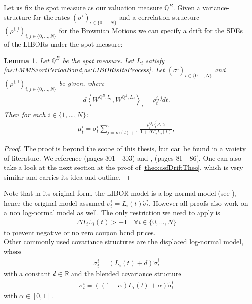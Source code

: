 \documentclass[12pt]{article}
\newtheorem{lemma}[theorem]{Lemma}
\begin{document}
	Let us fix the spot measure as our valuation measure $\mathbb{Q}^B$.
	Given a variance-structure for the rates $(\sigma^i)_{i\in\{0,...,N\}}$ and a correlation-structure $(\rho^{i,j})_{i,j \in \{0,...,N\}}$ for the Brownian Motions
	we can specify a drift for the SDEs of the LIBORs under the spot measure:
	\begin{lemma}\label{lem:LMMDriftSpec}
		Let $\mathbb{Q}^B$ be the spot measure.
		Let $L_i$ satisfy \cref{as:LMMShortPeriodBond,as:LIBORisItoProcess}. Let $(\sigma^i)_{i\in\{0,...,N\}}$ and $(\rho^{i,j})_{i,j \in \{0,...,N\}}$ be given, where
		\begin{align*}
			d\left\langle W^{\mathbb{Q}^B, L_i}, W^{\mathbb{Q}^B, L_j} \right\rangle_t = \rho^{i,j}_t dt.
		\end{align*}
		Then for each $i \in \{1, ..., N\}$:
		\begin{align*}
			\mu^{i}_t = \sigma^{i}_t\sum_{j=m(t)+1}^{i}\frac{\rho^{i j}_t \sigma^{j}_t\Delta T_j}{1 + \Delta T_j L_j(t)},
		\end{align*}
	\end{lemma}
	\begin{proof}
		The proof is beyond the scope of this thesis, but can be found in a variety of literature. We reference \cite{FriesBook} (pages 301 - 303) and \cite{fima3Lecture}, (pages 81 - 86). One can also take a look at the next section at the proof of \cref{theo:defDriftTheo}, which is very similar  and carries its idea and outline.
	\end{proof}
	Note that in its original form, the LIBOR model is a log-normal model (see \cite{FriesBook}), hence the original model assumed $\sigma^i_t = L_i(t)\tilde{\sigma}^i_t$. However all proofs also work on a non log-normal model as well. The only restriction we need to apply is
	\begin{align*}
		\Delta T_iL_i(t) > -1 \quad \forall i \in \{0,...,N\}
	\end{align*}
	to prevent negative or no zero coupon bond prices.\\
	Other commonly used covariance structures are the displaced log-normal model, where
	\begin{align*}
		\sigma^i_t = \left(L_i(t) + d\right)\tilde{\sigma}^i_t
	\end{align*}
	with a constant $d\in \mathbb{R}$ and the blended covariance structure
	\begin{align*}
		\sigma^i_t = \left((1-\alpha) L_i(t) + \alpha\right)\tilde{\sigma}^i_t
	\end{align*}
	with $\alpha \in \left[0, 1\right]$.\\
	
\end{document}
